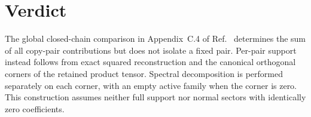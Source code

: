 \documentclass{article}
\begin{document}
\section{Verdict}

The global closed-chain comparison in Appendix~C.4 of
Ref.~\cite{Cirac2016MPDO_arXiv} determines the sum of all copy-pair
contributions but does not isolate a fixed pair. Per-pair support instead
follows from exact squared reconstruction and the canonical orthogonal
corners of the retained product tensor. Spectral decomposition is performed
separately on each corner, with an empty active family when the corner is
zero. This construction assumes neither full support nor normal sectors with
identically zero coefficients.



\end{document}
